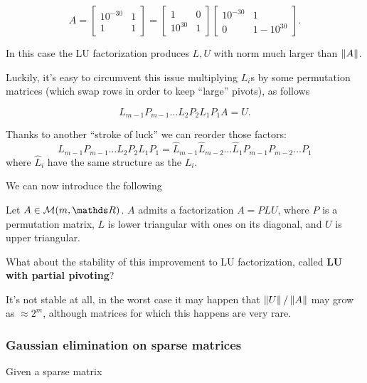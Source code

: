 \documentclass[computationalMathematics.tex]{subfiles}
\begin{document}
\begin{example}
\[
A = \begin{bmatrix}
    10^{-30} & 1\\
    1 & 1
\end{bmatrix} = \begin{bmatrix}
    1 & 0\\
    10^{30} & 1 
\end{bmatrix}
\begin{bmatrix}
    10^{-30} & 1\\
    0 & 1-10^{30}
\end{bmatrix}.
\]

In this case the LU factorization produces $L,U$ with norm much larger than $\left\lVert A\right\rVert$.
\end{example}

Luckily, it's easy to circumvent this issue multiplying $L_i$s by some permutation matrices (which swap rows in order to keep ``large'' pivots), as follows

\[
L_{m-1}P_{m-1}\dots L_2P_2L_1P_1A = U.
\]

\begin{obs}
Thanks to another ``stroke of luck'' we can reorder those factors: 
\[
L_{m-1}P_{m-1}\dots L_2P_2L_1P_1 = \widehat{L}_{m-1}\widehat{L}_{m-2}\dots \widehat{L}_1 P_{m-1}P_{m-2}\dots P_1
\]
where $\widehat{L}_i$ have the same structure as the $L_i$.
\end{obs}

We can now introduce the following

\begin{theorem}
  Let $A \in \mathcal{M}(m, \R)$. $A$ admits a factorization $A=PLU$, where $P$ is a permutation matrix, $L$ is lower triangular with ones on its diagonal, and $U$ is upper triangular.
\end{theorem}

What about the stability of this improvement to LU factorization, called \textbf{LU with partial pivoting}?

It's not stable at all, in the worst case it may happen that $\left\lVert U\right\rVert / \left\lVert A\right\rVert$ may grow as $\approx 2^m$, although matrices for which this happens are very rare.

\subsubsection{Gaussian elimination on sparse matrices}

Given a sparse matrix 
\end{document}
